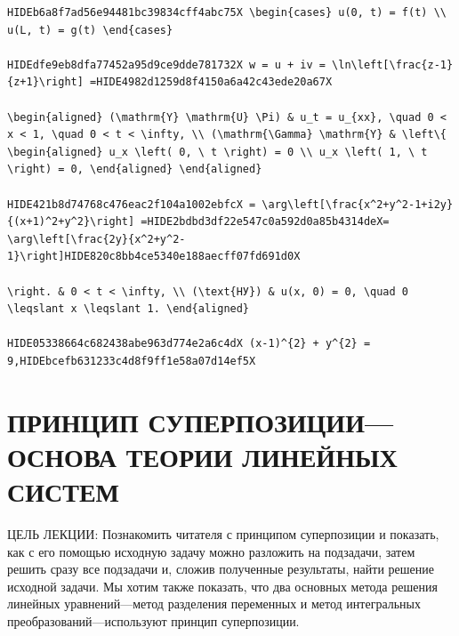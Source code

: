 \documentclass[
  ukrainian,
]{article}
\begin{document}
\begin{verbatim}
HIDEb6a8f7ad56e94481bc39834cff4abc75X \begin{cases} u(0, t) = f(t) \\ u(L, t) = g(t) \end{cases}

HIDEdfe9eb8dfa77452a95d9ce9dde781732X w = u + iv = \ln\left[\frac{z-1}{z+1}\right] =HIDE4982d1259d8f4150a6a42c43ede20a67X

\begin{aligned} (\mathrm{Y} \mathrm{U} \Pi) & u_t = u_{xx}, \quad 0 < x < 1, \quad 0 < t < \infty, \\ (\mathrm{\Gamma} \mathrm{Y} & \left\{ \begin{aligned} u_x \left( 0, \ t \right) = 0 \\ u_x \left( 1, \ t \right) = 0, \end{aligned} \end{aligned}

HIDE421b8d74768c476eac2f104a1002ebfcX = \arg\left[\frac{x^2+y^2-1+i2y}{(x+1)^2+y^2}\right] =HIDE2bdbd3df22e547c0a592d0a85b4314deX= \arg\left[\frac{2y}{x^2+y^2-1}\right]HIDE820c8bb4ce5340e188aecff07fd691d0X

\right. & 0 < t < \infty, \\ (\text{НУ}) & u(x, 0) = 0, \quad 0 \leqslant x \leqslant 1. \end{aligned}

HIDE05338664c682438abe963d774e2a6c4dX (x-1)^{2} + y^{2} = 9,HIDEbcefb631233c4d8f9ff1e58a07d14ef5X
\end{verbatim}

\section{ПРИНЦИП СУПЕРПОЗИЦИИ--- ОСНОВА ТЕОРИИ ЛИНЕЙНЫХ
СИСТЕМ}\label{ux43fux440ux438ux43dux446ux438ux43f-ux441ux443ux43fux435ux440ux43fux43eux437ux438ux446ux438ux438-ux43eux441ux43dux43eux432ux430-ux442ux435ux43eux440ux438ux438-ux43bux438ux43dux435ux439ux43dux44bux445-ux441ux438ux441ux442ux435ux43c}

ЦЕЛЬ ЛЕКЦИИ: Познакомить читателя с принципом суперпозиции и показать,
как с его помощью исходную задачу можно разложить на подзадачи, затем
решить сразу все подзадачи и, сложив полученные результаты, найти
решение исходной задачи. Мы хотим также показать, что два основных
метода решения линейных уравнений---метод разделения переменных и метод
интегральных преобразований---используют принцип суперпозиции.
\end{document}
